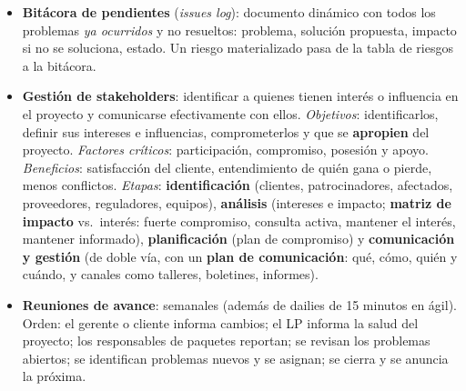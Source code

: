 \documentclass[11pt,a4paper]{article}
\begin{document}
\begin{itemize}
  \item \textbf{Bitácora de pendientes} (\emph{issues log}): documento dinámico con todos los problemas
  \emph{ya ocurridos} y no resueltos: problema, solución propuesta, impacto si no se soluciona, estado. Un
  riesgo materializado pasa de la tabla de riesgos a la bitácora.
  \item \textbf{Gestión de stakeholders}: identificar a quienes tienen interés o influencia en el proyecto y
  comunicarse efectivamente con ellos. \emph{Objetivos}: identificarlos, definir sus intereses e influencias,
  comprometerlos y que se \textbf{apropien} del proyecto. \emph{Factores críticos}: participación, compromiso,
  posesión y apoyo. \emph{Beneficios}: satisfacción del cliente, entendimiento de quién gana o pierde, menos
  conflictos. \emph{Etapas}: \textbf{identificación} (clientes, patrocinadores, afectados, proveedores,
  reguladores, equipos), \textbf{análisis} (intereses e impacto; \textbf{matriz de impacto} vs.\ interés: fuerte
  compromiso, consulta activa, mantener el interés, mantener informado), \textbf{planificación} (plan de
  compromiso) y \textbf{comunicación y gestión} (de doble vía, con un \textbf{plan de comunicación}: qué, cómo,
  quién y cuándo, y canales como talleres, boletines, informes).
  \item \textbf{Reuniones de avance}: semanales (además de dailies de 15 minutos en ágil). Orden: el gerente o
  cliente informa cambios; el LP informa la salud del proyecto; los responsables de paquetes reportan; se
  revisan los problemas abiertos; se identifican problemas nuevos y se asignan; se cierra y se anuncia la
  próxima.
\end{itemize}
\end{document}
